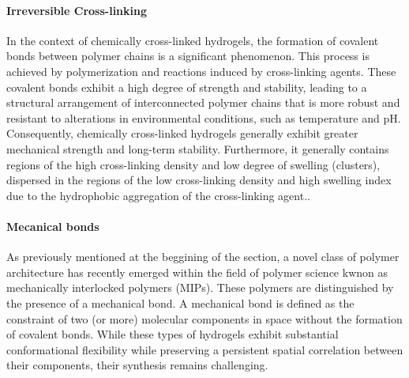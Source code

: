 \paragraph{Irreversible Cross-linking}
In the context of chemically cross-linked hydrogels, the formation of covalent bonds between polymer chains is a significant phenomenon.
This process is achieved by polymerization and reactions induced by cross-linking agents.
These covalent bonds exhibit a high degree of strength and stability, leading to a structural arrangement of interconnected polymer chains that is more robust and resistant to alterations in environmental conditions, such as temperature and pH.
Consequently, chemically cross-linked hydrogels generally exhibit greater mechanical strength and long-term stability.  
Furthermore, it generally contains regions of the high cross-linking density and low degree of swelling (clusters), dispersed in the regions of the low cross-linking density and high swelling index due to the hydrophobic aggregation of the cross-linking agent\citep{bustamante-torresHydrogelsClassificationAccording2021}.. 

\paragraph{Mecanical bonds}
As previously mentioned at the beggining of the section, a novel class of polymer architecture has recently emerged within the field of polymer science kwnon as mechanically interlocked polymers (MIPs). 
These polymers are distinguished by the presence of a mechanical bond.
A mechanical bond is defined as the constraint of two (or more) molecular components in space without the formation of covalent bonds\citep{hartMaterialPropertiesApplications2021}.
While these types of hydrogels exhibit substantial conformational flexibility while preserving a persistent spatial correlation between their components, their synthesis remains challenging.



